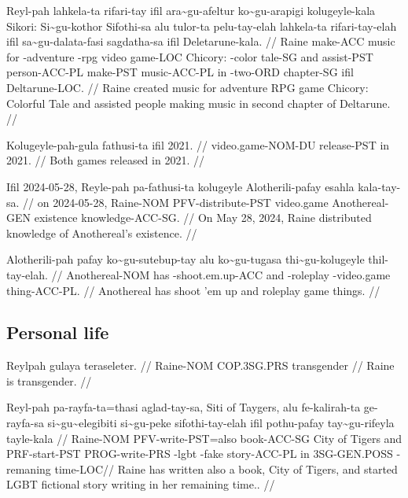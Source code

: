 \ex
\begingl
\gla Reyl-pah lahkela-ta rifari-tay ifil ara\~{}gu-afeltur ko\~{}gu-arapigi kolugeyle-kala Sikori: Si\~{}gu-kothor Sifothi-sa alu tulor-ta pelu-tay-elah lahkela-ta rifari-tay-elah ifil sa\~{}gu-dalata-fasi sagdatha-sa ifil Deletarune-kala. //
\glb Raine make-ACC music for \agradj{}-adventure \agradj{}-rpg video game-LOC Chicory: \agradj{}-color tale-SG and assist-PST person-ACC-PL make-PST music-ACC-PL in \agradj{}-two-ORD chapter-SG ifil Deltarune-LOC. //
\glft Raine created music for adventure RPG game Chicory: Colorful Tale and assisted people making music in second chapter of Deltarune. //
\endgl
\xe

\ex
\begingl
\gla Kolugeyle-pah-gula fathusi-ta ifil 2021. //
\glb video.game-NOM-DU release-PST in 2021. //
\glft Both games released in 2021. //
\endgl
\xe

\ex
\begingl
\gla Ifil 2024-05-28, Reyle-pah pa-fathusi-ta kolugeyle Alotherili-pafay esahla kala-tay-sa. //
\glb on 2024-05-28, Raine-NOM PFV-distribute-PST video.game Anothereal-GEN existence knowledge-ACC-SG. //
\glft On May 28, 2024, Raine distributed knowledge of Anothereal's existence. //
\endgl
\xe

\ex
\begingl
\gla Alotherili-pah pafay ko\~{}gu-sutebup-tay alu ko\~{}gu-tugasa thi\~{}gu-kolugeyle thil-tay-elah. //
\glb Anothereal-NOM has \agradj{}-shoot.em.up-ACC and \agradj{}-roleplay \agradj{}-video.game thing-ACC-PL. //
\glft Anothereal has shoot 'em up and roleplay game things. //
\endgl
\xe

\subsection{Personal life}

\ex
\begingl
\gla  Reylpah   gulaya      teraseleter. //
\glb  Raine-NOM COP.3SG.PRS transgender  //
\glft Raine is transgender. //
\endgl
\xe

\ex
\begingl
\gla  Reyl-pah  pa-rayfa-ta=thasi  aglad-tay-sa, Siti of Taygers, alu fe-kalirah-ta ge-rayfa-sa    si\~{}gu\~{}elegibiti si\~{}gu-peke   sifothi-tay-elah ifil pothu-pafay  tay\~{}gu-rifeyla   tayle-kala //
\glb  Raine-NOM PFV-write-PST=also book-ACC-SG   City of Tigers   and PRF-start-PST PROG-write-PRS \agradj{}-lgbt    \agradj{}-fake story-ACC-PL     in   3SG-GEN.POSS \agradj{}-remaning time-LOC//  
\glft Raine has written also a book, City of Tigers, and started LGBT fictional story writing in her remaining time.. //
\endgl
\xe



